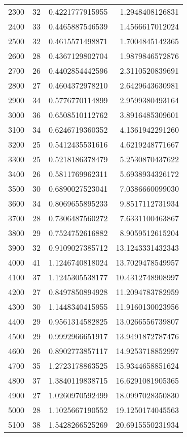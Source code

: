 \begin{longtable}{lrrr}
2300 & 32 & 0.4221777915955 & 1.2948408126831 \\
2400 & 33 & 0.4465887546539 & 1.4566617012024 \\
2500 & 32 & 0.4615571498871 & 1.7004845142365 \\
2600 & 28 & 0.4367129802704 & 1.9879846572876 \\
2700 & 26 & 0.4402854442596 & 2.3110520839691 \\
2800 & 27 & 0.4604372978210 & 2.6429643630981 \\
2900 & 34 & 0.5776770114899 & 2.9599380493164 \\
3000 & 36 & 0.6508510112762 & 3.8916485309601 \\
3100 & 34 & 0.6246719360352 & 4.1361942291260 \\
3200 & 25 & 0.5412435531616 & 4.6219248771667 \\
3300 & 25 & 0.5218186378479 & 5.2530870437622 \\
3400 & 26 & 0.5811769962311 & 5.6938934326172 \\
3500 & 30 & 0.6890027523041 & 7.0386660099030 \\
3600 & 34 & 0.8069655895233 & 9.8517112731934 \\
3700 & 28 & 0.7306487560272 & 7.6331100463867 \\
3800 & 29 & 0.7524752616882 & 8.9059512615204 \\
3900 & 32 & 0.9109027385712 & 13.1243331432343 \\
4000 & 41 & 1.1246740818024 & 13.7029478549957 \\
4100 & 37 & 1.1245305538177 & 10.4312748908997 \\
4200 & 27 & 0.8497850894928 & 11.2094783782959 \\
4300 & 30 & 1.1448340415955 & 11.9160130023956 \\
4400 & 29 & 0.9561314582825 & 13.0266556739807 \\
4500 & 29 & 0.9992966651917 & 13.9491872787476 \\
4600 & 26 & 0.8902773857117 & 14.9253718852997 \\
4700 & 35 & 1.2723178863525 & 15.9344658851624 \\
4800 & 37 & 1.3840119838715 & 16.6291081905365 \\
4900 & 27 & 1.0260970592499 & 18.0997028350830 \\
5000 & 28 & 1.1025667190552 & 19.1250174045563 \\
5100 & 38 & 1.5428266525269 & 20.6915550231934 \\
\end{longtable}
